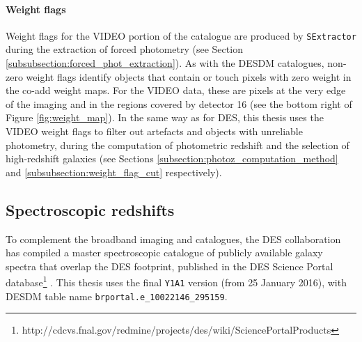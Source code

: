 \paragraph{Weight flags} Weight flags for the VIDEO portion of the \DESVIDEO catalogue are produced by \texttt{SExtractor} during the extraction of forced photometry (see Section \ref{subsubsection:forced_phot_extraction}). As with the DESDM catalogues, non-zero weight flags identify objects that contain or touch pixels with zero weight in the co-add weight maps. For the VIDEO data, these are pixels at the very edge of the imaging and in the regions covered by detector 16 (see the bottom right of Figure \ref{fig:weight_map}). In the same way as for DES, this thesis uses the VIDEO weight flags to filter out artefacts and objects with unreliable photometry, during the computation of photometric redshift and the selection of high-redshift galaxies (see Sections \ref{subsection:photoz_computation_method} and \ref{subsubsection:weight_flag_cut} respectively).  \par


\subsection{Spectroscopic redshifts}\label{subsection:spectra}
To complement the broadband imaging and catalogues, the DES collaboration has compiled a master spectroscopic catalogue of publicly available galaxy spectra that overlap the DES footprint, published in the DES Science Portal database\footnote{\color{blue} http://cdcvs.fnal.gov/redmine/projects/des/wiki/SciencePortalProducts} \citep{2018A&C....24...52F}. This thesis uses the final \texttt{Y1A1} version (from 25 January 2016), with DESDM table name \texttt{brportal.e\_10022146\_295159}.  \par

